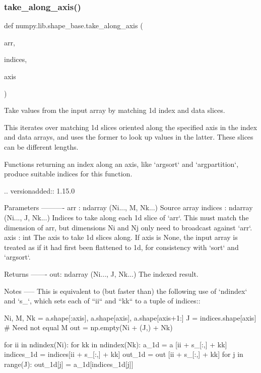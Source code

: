 \subsubsection{\texorpdfstring{take\+\_\+along\+\_\+axis()}{take\_along\_axis()}}
{\footnotesize\ttfamily def numpy.\+lib.\+shape\+\_\+base.\+take\+\_\+along\+\_\+axis (\begin{DoxyParamCaption}\item[{}]{arr,  }\item[{}]{indices,  }\item[{}]{axis }\end{DoxyParamCaption})}

\begin{DoxyVerb}Take values from the input array by matching 1d index and data slices.

This iterates over matching 1d slices oriented along the specified axis in
the index and data arrays, and uses the former to look up values in the
latter. These slices can be different lengths.

Functions returning an index along an axis, like `argsort` and
`argpartition`, produce suitable indices for this function.

.. versionadded:: 1.15.0

Parameters
----------
arr : ndarray (Ni..., M, Nk...)
    Source array
indices : ndarray (Ni..., J, Nk...)
    Indices to take along each 1d slice of `arr`. This must match the
    dimension of arr, but dimensions Ni and Nj only need to broadcast
    against `arr`.
axis : int
    The axis to take 1d slices along. If axis is None, the input array is
    treated as if it had first been flattened to 1d, for consistency with
    `sort` and `argsort`.

Returns
-------
out: ndarray (Ni..., J, Nk...)
    The indexed result.

Notes
-----
This is equivalent to (but faster than) the following use of `ndindex` and
`s_`, which sets each of ``ii`` and ``kk`` to a tuple of indices::

    Ni, M, Nk = a.shape[:axis], a.shape[axis], a.shape[axis+1:]
    J = indices.shape[axis]  # Need not equal M
    out = np.empty(Ni + (J,) + Nk)

    for ii in ndindex(Ni):
        for kk in ndindex(Nk):
            a_1d       = a      [ii + s_[:,] + kk]
            indices_1d = indices[ii + s_[:,] + kk]
            out_1d     = out    [ii + s_[:,] + kk]
            for j in range(J):
                out_1d[j] = a_1d[indices_1d[j]]


\end{DoxyVerb}
